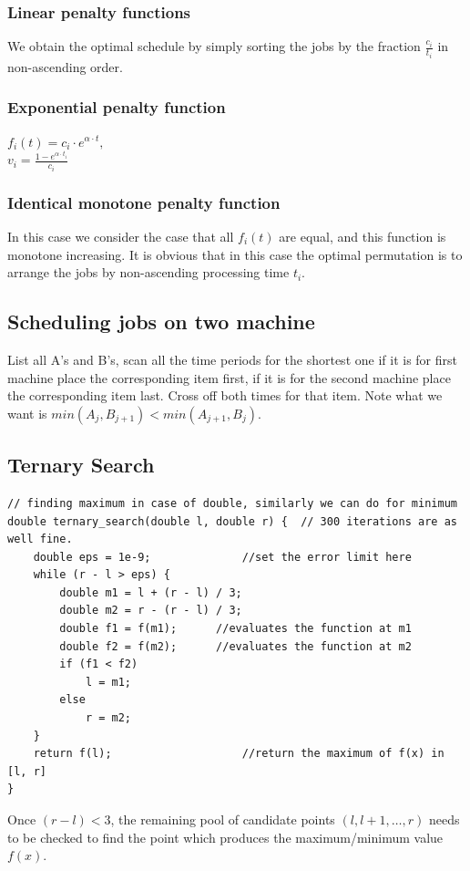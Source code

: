 \documentclass[8pt, a4paper, oneside, twocolumn]{extarticle}
\begin{document}
\subsubsection{Linear penalty functions}
We obtain the optimal schedule by simply sorting the jobs by the fraction $\frac{c_i}{t_i}$ in non-ascending order.
\subsubsection{Exponential penalty function}
$f_i(t) = c_i \cdot e^{\alpha \cdot t},$ 
\\$v_i = \frac{1 - e^{\alpha \cdot t_i}}{c_i}$
\subsubsection{Identical monotone penalty function}
In this case we consider the case that all $f_i(t)$ are equal, and this function is monotone increasing.
It is obvious that in this case the optimal permutation is to arrange the jobs by non-ascending processing time $t_i$.
\subsection{Scheduling jobs on two machine}
List all A's and B's, scan all the time periods for the shortest one if it is for first machine place the corresponding item first, if it is for the second machine place the corresponding item last. Cross off both times for that item. Note what we want is $min (A_j, B_{j + 1}) < min (A_{j + 1}, B_j)$.
\subsection{Ternary Search}
\begin{verbatim}
// finding maximum in case of double, similarly we can do for minimum
double ternary_search(double l, double r) {  // 300 iterations are as well fine.
    double eps = 1e-9;              //set the error limit here
    while (r - l > eps) {
        double m1 = l + (r - l) / 3;
        double m2 = r - (r - l) / 3;
        double f1 = f(m1);      //evaluates the function at m1
        double f2 = f(m2);      //evaluates the function at m2
        if (f1 < f2)
            l = m1;
        else
            r = m2;
    }
    return f(l);                    //return the maximum of f(x) in [l, r]
}
\end{verbatim}
Once $(r - l) < 3$, the remaining pool of candidate points $(l, l + 1, \ldots, r)$ needs to be checked to find the point which produces the maximum/minimum value $f(x)$.
\end{document}

